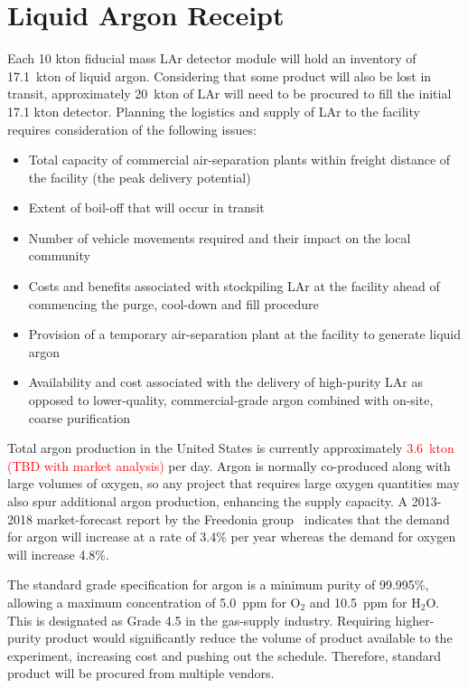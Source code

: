 \section{Liquid Argon Receipt}

Each 10 kton fiducial mass LAr detector module will hold an inventory 
of 17.1~kton of liquid argon.   
Considering that some product will also be lost in transit, approximately 
20~kton of LAr will need to be procured to fill 
the initial 17.1 kton detector.  Planning the 
logistics and supply of LAr to the facility requires consideration of the following issues:

\begin{itemize}
\item  Total capacity of commercial air-separation plants within freight distance of the facility (the peak delivery potential)
\item Extent of boil-off that will occur in transit
\item Number of vehicle movements required and their impact on the local community
\item Costs and benefits associated with stockpiling LAr at the facility ahead of commencing the purge, cool-down and fill procedure
\item Provision of a temporary air-separation plant at the facility to generate liquid argon
\item Availability and cost associated with the delivery of high-purity LAr as opposed to lower-quality, commercial-grade argon combined with on-site, coarse purification
\end{itemize}

Total argon production in the United States is currently approximately 
\textcolor{red}{3.6~kton (TBD with market analysis)} per day. Argon is normally co-produced 
along with large volumes of oxygen, so any project that requires large 
oxygen quantities may also spur additional argon production, enhancing the
supply capacity.  A 2013-2018 market-forecast report by the Freedonia 
group~\cite{freedonia} indicates that the demand for argon will increase 
at a rate of 3.4\% per year whereas the demand 
for oxygen will increase 4.8\%.  

The standard grade specification for argon is a minimum purity of
 99.995\%, allowing a maximum concentration of 5.0~ppm for O$_2$ 
and 10.5~ppm for H$_{2}$O.  This is designated as Grade 4.5 in 
the gas-supply industry.  Requiring higher-purity product would 
significantly reduce the volume of product available to the 
experiment, increasing cost and pushing out the schedule.  
Therefore, standard product will be procured from multiple vendors.  

